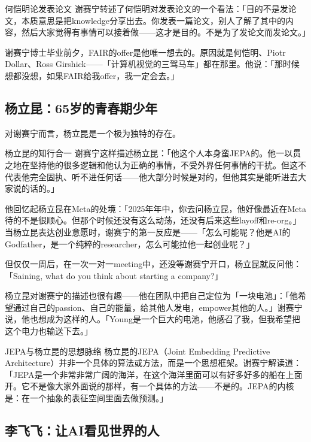 \documentclass[a4paper]{article}
\begin{document}
\begin{knowledgebox}{何恺明论发表论文}
谢赛宁转述了何恺明对发表论文的一个看法：「目的不是发论文，本质意思是把knowledge分享出去。你发表一篇论文，别人了解了其中的内容，然后大家觉得有事情可以接着做——这才是目的。不是为了发论文而发论文。」
\end{knowledgebox}

谢赛宁博士毕业前夕，FAIR的offer是他唯一想去的。原因就是何恺明、Piotr Dollar、Ross Girshick——「计算机视觉的三驾马车」都在那里。他说：「那时候想都没想，如果FAIR给我offer，我一定会去。」

\subsection{杨立昆：65岁的青春期少年}

对谢赛宁而言，杨立昆是一个极为独特的存在。

\begin{importantbox}{杨立昆的知行合一}
谢赛宁这样描述杨立昆：「他这个人本身蛮JEPA的。他一以贯之地在坚持他的很多逻辑和他认为正确的事情，不受外界任何事情的干扰。但这不代表他完全固执、听不进任何话——他大部分时候是对的，但他其实是能听进去大家说的话的。」
\end{importantbox}

他回忆起杨立昆在Meta的处境：「2025年年中，你去问杨立昆，他好像最近在Meta待的不是很顺心。但那个时候还没有这么动荡，还没有后来这些layoff和re-org。」当杨立昆表达创业意愿时，谢赛宁的第一反应是——「怎么可能呢？他是AI的Godfather，是一个纯粹的researcher，怎么可能拉他一起创业呢？」

但仅仅一周后，在一次一对一meeting中，还没等谢赛宁开口，杨立昆就反问他：「Saining, what do you think about starting a company?」

杨立昆对谢赛宁的描述也很有趣——他在团队中把自己定位为「一块电池」：「他希望通过自己的passion、自己的能量，给其他人发电，empower其他的人。」谢赛宁说，他也想成为这样的人。「Young是一个巨大的电池，他感召了我，但我希望把这个电力也输送下去。」

\begin{knowledgebox}{JEPA与杨立昆的思想脉络}
杨立昆的JEPA（Joint Embedding Predictive Architecture）并非一个具体的算法或方法，而是一个思想框架。谢赛宁解读道：「JEPA是一个非常非常广阔的海洋，在这个海洋里面可以有好多好多的船在上面开。它不是像大家外面说的那样，有一个具体的方法——不是的。JEPA的内核是：在一个抽象的表征空间里面去做预测。」
\end{knowledgebox}

\subsection{李飞飞：让AI看见世界的人}
\end{document}
